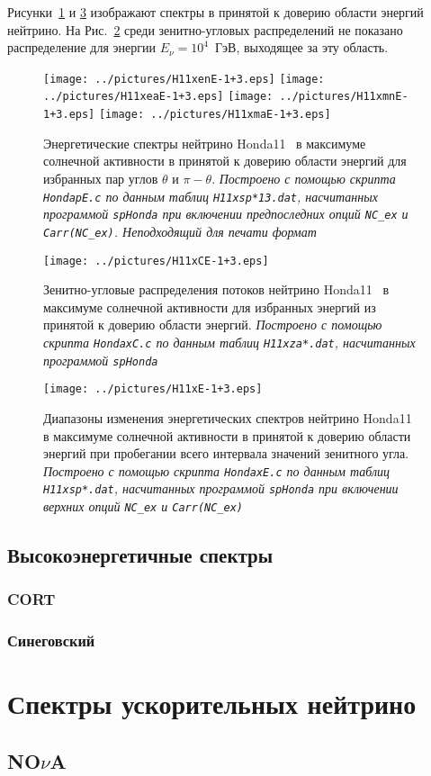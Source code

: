 Рисунки~\ref{Honda11maxsE-1+3} и \ref{Honda11maxE-1+3} изображают спектры в принятой к доверию области энергий нейтрино. На Рис.~\ref{Honda11maxCE-1+3} среди зенитно-угловых распределений не показано распределение для энергии $E_{\nu}=10^{4}$~ГэВ, выходящее за эту область.
\begin{figure}[!ht]
\texttt{[image: ../pictures/H11xenE-1+3.eps]}
\texttt{[image: ../pictures/H11xeaE-1+3.eps]}
\texttt{[image: ../pictures/H11xmnE-1+3.eps]}
\texttt{[image: ../pictures/H11xmaE-1+3.eps]}
\caption{Энергетические спектры нейтрино Honda11~\cite{Honda:2011nf} в максимуме солнечной активности в принятой к доверию области энергий для избранных пар углов $\theta$ и $\pi-\theta$. \textit{Построено с помощью скрипта \texttt{HondapE.c} по данным таблиц \texttt{H11xsp*13.dat}, насчитанных программой \texttt{spHonda} при включении предпоследних опций \texttt{NC\_ex} и \texttt{Carr(NC\_ex)}. {\color{magenta}Неподходящий для печати формат}}}
\label{Honda11maxsE-1+3}
\end{figure}
\begin{figure}[!ht]
\begin{center}
\texttt{[image: ../pictures/H11xCE-1+3.eps]}
\end{center}
\caption{Зенитно-угловые распределения потоков нейтрино Honda11~\cite{Honda:2011nf} в максимуме солнечной активности для избранных энергий из принятой к доверию области энергий. \textit{Построено с помощью скрипта \texttt{HondaxC.c} по данным таблиц \texttt{H11xza*.dat}, насчитанных программой \texttt{spHonda}}}
\label{Honda11maxCE-1+3}
\end{figure}

\clearpage
\begin{figure}[!ht]
\begin{center}
\texttt{[image: ../pictures/H11xE-1+3.eps]}
\end{center}
\caption{Диапазоны изменения энергетических спектров нейтрино Honda11~\cite{Honda:2011nf} в максимуме солнечной активности в принятой к доверию области энергий при пробегании всего интервала значений зенитного угла. \textit{Построено с помощью скрипта \texttt{HondaxE.c} по данным таблиц \texttt{H11xsp*.dat}, насчитанных программой \texttt{spHonda} при включении верхних опций \texttt{NC\_ex} и \texttt{Carr(NC\_ex)}}}
\label{Honda11maxE-1+3}
\end{figure}

\subsection{Высокоэнергетичные спектры}
\subsubsection{CORT}
\subsubsection{Синеговский}

\section{Спектры ускорительных нейтрино}
\subsection{NO$\nu$A}
